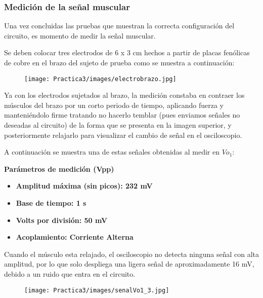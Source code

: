 \documentclass[12pt]{article}
\begin{document}
	\newpage
	\subsubsection{Medición de la señal muscular}
	Una vez concluidas las pruebas que muestran la correcta configuración del circuito, es momento de medir la señal muscular.
	
	Se deben colocar tres electrodos de 6 x 3 cm hechos a partir de placas fenólicas de cobre en el brazo del sujeto de prueba como se muestra a continuación:
	
	        \begin{figure}[h!]
                \centering
                \texttt{[image: Practica3/images/electrobrazo.jpg]}
            \end{figure}
    
    Ya con los electrodos sujetados al brazo, la medición constaba en contraer los músculos del brazo por un corto periodo de tiempo, aplicando fuerza y manteniéndolo firme tratando no hacerlo temblar (pues enviamos señales no deseadas al circuito) de la forma que se presenta en la imagen superior, y posteriormente relajarlo para visualizar el cambio de señal en el osciloscopio.
    
    A continuación se muestra una de estas señales obtenidas al medir en $Vo_{1}$:
    
    \textbf{Parámetros de medición (Vpp)}
            \begin{multicols}{2}
                \begin{itemize}
                    \item[\checkmark] \textbf{Amplitud máxima (sin picos): 232 mV}
                    \item[\checkmark] \textbf{Base de tiempo: 1 s}
            \columnbreak
                    \item[\checkmark] \textbf{Volts por división: 50 mV}
                    \item[\checkmark] \textbf{Acoplamiento: Corriente Alterna}
                \end{itemize}
            \end{multicols}
            
            Cuando el músculo esta relajado, el osciloscopio no detecta ninguna señal con alta amplitud, por lo que solo despliega una ligera señal de aproximadamente 16 mV, debido a un ruido que entra en el circuito.
    \newpage
	        \begin{figure}[h!]
                \centering
                \texttt{[image: Practica3/images/senalVo1\_3.jpg]}
            \end{figure}
            
\end{document}

